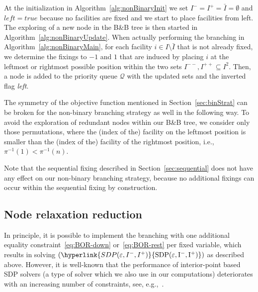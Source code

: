 \documentclass{article}
\newcommand{\myrefmath}[1]{(\hyperlink{#1}{\mathrm{#1}})}
\newcommand{\BB}{B\&B\xspace}
\begin{document}
At the initialization in Algorithm~\ref{alg:nonBinaryInit} we set $I^- = I^+ = \bar{I} = \emptyset$ and $left=true$ because no facilities are fixed and we start to place facilities from left. The exploring of a new node in the \BB tree is then started in Algorithm~\ref{alg:nonBinaryUpdate}. When actually performing the branching in Algorithm~\ref{alg:nonBinaryMain}, for each facility $i \in I\setminus\bar{I}$ that is not already fixed, we determine the fixings to $-1$ and $1$ that are induced by placing $i$ at the leftmost or rightmost possible position within the two sets $I^{--}, I^{++} \subseteq I^2$.
Then, a node is added to the priority queue $\mathcal{Q}$ with the updated sets and the inverted flag \emph{left}.

The symmetry of the objective function mentioned in Section~\ref{sec:binStrat} can be broken for the non-binary branching strategy as well in the following way.
To avoid the exploration of redundant nodes within our \BB tree, we consider only those permutations, where the (index of the) facility on the leftmost position is smaller than the (index of the) facility of the rightmost position, i.e., $\pi^{-1}(1) < \pi^{-1}(n)$. 

Note that the sequential fixing described in Section~\ref{sec:sequential} does not have any effect on our non-binary branching strategy, because no additional fixings can occur within the sequential fixing by construction.

\subsection{Node relaxation reduction}\label{sec:reduction}
In principle, it is possible to implement the branching with one additional equality constraint~\eqref{eq:BOR-down} or~\eqref{eq:BOR-rest} per fixed variable, which results in solving $\myrefmath{SDP(\varepsilon,I^-,I^+)}$ as described above. 
However, it is well-known that the performance of interior-point based SDP solvers (a type of solver which we also use in our computations) deteriorates with an increasing number of constraints, see, e.g.,~\citet{BORCHERS2007}. 
\end{document}
